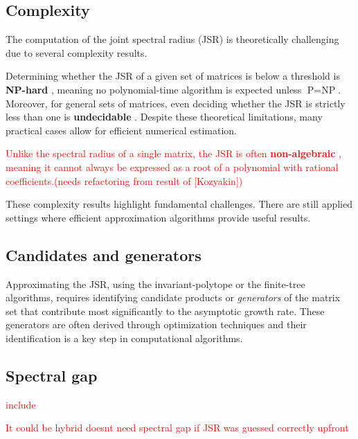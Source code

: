 \subsection*{Complexity}

The computation of the joint spectral radius (JSR) is theoretically challenging due to several complexity results.

Determining whether the JSR of a given set of matrices is below a threshold is \textbf{NP-hard} \citep{tsitsiklis1997lyapunov}, meaning no polynomial-time algorithm is expected unless $\text{P} = \text{NP}$. Moreover, for general sets of matrices, even deciding whether the JSR is strictly less than one is \textbf{undecidable} \citep{blondel2000boundedness}. Despite these theoretical limitations, many practical cases allow for efficient numerical estimation.

\textcolor{red}{Unlike the spectral radius of a single matrix, the JSR is often \textbf{non-algebraic} \citep{guglielmiExactComputationJoint2011}, meaning it cannot always be expressed as a root of a polynomial with rational coefficients.(needs refactoring from result of [Kozyakin])}

These complexity results highlight fundamental challenges. There are still applied settings where efficient approximation algorithms provide useful results.

\subsection*{Candidates and generators}
Approximating the JSR, using the invariant-polytope or the finite-tree algorithms, requires identifying candidate products or \emph{generators} of the matrix set that contribute most significantly to the asymptotic growth rate. These generators are often derived through optimization techniques and their identification is a key step in computational algorithms.

\subsection*{Spectral gap}
\begin{definition}
\textcolor{red}{include}
\end{definition}

\begin{remark}
    \textcolor{red}{It could be hybrid doesnt need spectral gap if JSR was guessed correctly upfront}
\end{remark}

